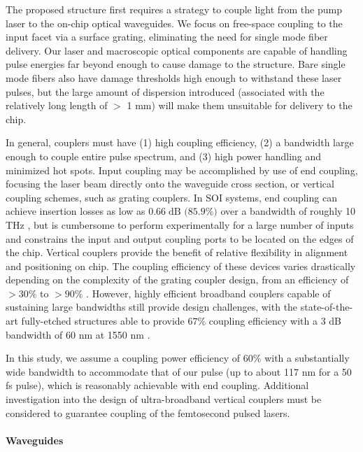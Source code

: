 The proposed structure first requires a strategy to couple light from the pump laser to the on-chip optical waveguides.
We focus on free-space coupling to the input facet via a surface grating, eliminating the need for single mode fiber delivery.
Our laser and macroscopic optical components are capable of handling pulse energies far beyond enough to cause damage to the structure.
Bare single mode fibers also have damage thresholds high enough to withstand these laser pulses, but the large amount of dispersion introduced (associated with the relatively long length of $>$ 1 mm) will make them unsuitable for delivery to the chip.
 

In general, couplers must have (1) high coupling efficiency, (2) a bandwidth large enough to couple entire pulse spectrum, and (3) high power handling and minimized hot spots.
Input coupling may be accomplished by use of end coupling, focusing the laser beam directly onto the waveguide cross section, or vertical coupling schemes, such as grating couplers.
In SOI systems, end coupling can achieve insertion losses as low as $0.66\;\text{dB (85.9\%)}$ over a bandwidth of roughly 10 THz \cite{pu2010ultra}, but is cumbersome to perform experimentally for a large number of inputs and constrains the input and output coupling ports to be located on the edges of the chip.
Vertical couplers provide the benefit of relative flexibility in alignment and positioning on chip.
The coupling efficiency of these devices varies drastically depending on the complexity of the grating coupler design, from an efficiency of $>30\%$ to $>90\%$ \cite{taillaert2006grating}.
However, highly efficient broadband couplers capable of sustaining large bandwidths still provide design challenges, with the state-of-the-art fully-etched structures able to provide $67\%$ coupling efficiency with a 3 dB bandwidth of 60 nm at 1550 nm \cite{ding2013ultrahigh}.

In this study, we assume a coupling power efficiency of $60\%$ with a substantially wide bandwidth to accommodate that of our pulse (up to about 117 nm for a 50 fs pulse), which is reasonably achievable with end coupling.
Additional investigation into the design of ultra-broadband vertical couplers must be considered to guarantee coupling of the femtosecond pulsed lasers.

\paragraph{Waveguides}

